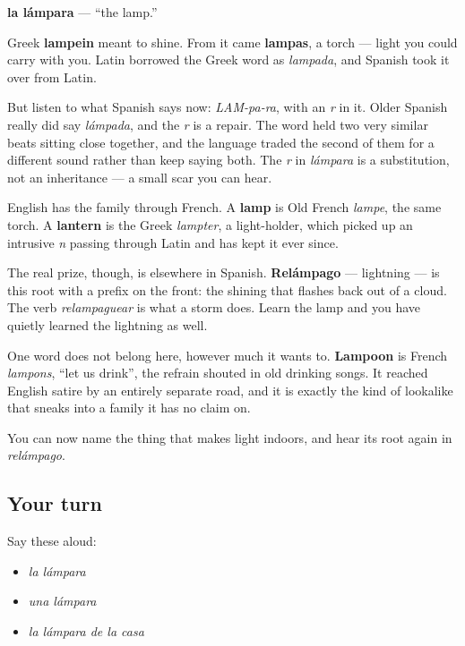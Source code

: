 \begin{cousinweb}
\textbf{la lámpara} — \textquotedblleft{}the lamp.\textquotedblright{}

Greek \textbf{lampein} meant to shine. From it came \textbf{lampas}, a torch — light you could carry with you. Latin borrowed the Greek word as \emph{lampada}, and Spanish took it over from Latin.

But listen to what Spanish says now: \emph{LAM-pa-ra}, with an \emph{r} in it. Older Spanish really did say \emph{lámpada}, and the \emph{r} is a repair. The word held two very similar beats sitting close together, and the language traded the second of them for a different sound rather than keep saying both. The \emph{r} in \emph{lámpara} is a substitution, not an inheritance — a small scar you can hear.

English has the family through French. A \textbf{lamp} is Old French \emph{lampe}, the same torch. A \textbf{lantern} is the Greek \emph{lampter}, a light-holder, which picked up an intrusive \emph{n} passing through Latin and has kept it ever since.

The real prize, though, is elsewhere in Spanish. \textbf{Relámpago} — lightning — is this root with a prefix on the front: the shining that flashes back out of a cloud. The verb \emph{relampaguear} is what a storm does. Learn the lamp and you have quietly learned the lightning as well.

One word does not belong here, however much it wants to. \textbf{Lampoon} is French \emph{lampons}, \textquotedblleft{}let us drink\textquotedblright{}, the refrain shouted in old drinking songs. It reached English satire by an entirely separate road, and it is exactly the kind of lookalike that sneaks into a family it has no claim on.
\end{cousinweb}

\begin{grammarlens}[title={What you've built}]
You can now name the thing that makes light indoors, and hear its root again in \emph{relámpago}.
\end{grammarlens}

\subsection*{Your turn}
Say these aloud:

\begin{itemize}
\raggedright
  \item \emph{la lámpara}
  \item \emph{una lámpara}
  \item \emph{la lámpara de la casa}
\end{itemize}

